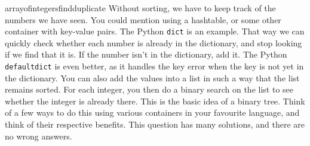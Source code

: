 \begin{answer}{arrayofintegersfindduplicate}
 Without sorting, we have to keep track of the numbers we have seen.
 You could mention using a hashtable, or some other container with key-value pairs.
 The Python \verb+dict+ is an example.
 That way we can quickly check whether each number is already in the dictionary, and stop looking if we find that it is.
 If the number isn't in the dictionary, add it.
 The Python \verb+defaultdict+ is even better, as it handles the key error when the key is not yet in the dictionary.
 You can also  add the values into a list in such a way that the list remains sorted.
 For each integer, you then do a binary search on the list to see whether the integer is already there.
 This is the basic idea of a binary tree.
 Think of a few ways to do this using various containers in your favourite language, and think of their respective benefits.
 This question has many solutions, and there are no wrong answers.


\end{answer}
